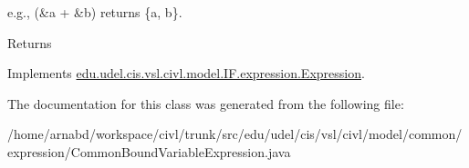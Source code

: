 e.\+g., {\ttfamily (\&a + \&b)} returns {\ttfamily \{a, b\}}.

\begin{DoxyReturn}{Returns}

\end{DoxyReturn}


Implements \hyperlink{interfaceedu_1_1udel_1_1cis_1_1vsl_1_1civl_1_1model_1_1IF_1_1expression_1_1Expression_ac2ad0236534bec54b91ee78ff658cbe0}{edu.\+udel.\+cis.\+vsl.\+civl.\+model.\+I\+F.\+expression.\+Expression}.



The documentation for this class was generated from the following file\+:\begin{DoxyCompactItemize}
\item 
/home/arnabd/workspace/civl/trunk/src/edu/udel/cis/vsl/civl/model/common/expression/Common\+Bound\+Variable\+Expression.\+java\end{DoxyCompactItemize}
